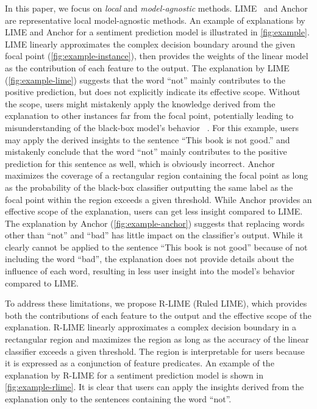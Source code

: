\documentclass[runningheads]{llncs}
\begin{document}
In this paper,
we focus on \emph{local} and \emph{model-agnostic} methods.
LIME~\cite{ribeiro2016why} and Anchor~\cite{ribeiro2018anchors}
are representative local model-agnostic methods.
An example of explanations by LIME and Anchor
for a sentiment prediction model is illustrated in \cref{fig:example}.
LIME linearly approximates the complex decision boundary
around the given focal point (\cref{fig:example-instance}),
then provides the weights of the linear model as the contribution of each feature
to the output.
The explanation by LIME (\cref{fig:example-lime}) suggests that
the word ``not'' mainly contributes to the positive prediction,
but does not explicitly indicate its effective scope.
Without the scope,
users might mistakenly apply the knowledge derived from the explanation
to other instances far from the focal point,
potentially leading to misunderstanding of the black-box model's behavior
~\cite{ribeiro2018anchors}.
For this example,
users may apply the derived insights
to the sentence ``This book is not good.'' %
and mistakenly conclude that the word ``not''
mainly contributes to the positive prediction for this sentence as well,
which is obviously incorrect.
Anchor maximizes the coverage of a rectangular region containing the focal point
as long as the probability of the black-box classifier outputting
the same label as the focal point within the region exceeds a given threshold.
While Anchor provides an effective scope of the explanation,
users can get less insight compared to LIME\@.
The explanation by Anchor (\cref{fig:example-anchor})
suggests that replacing words other than ``not'' and ``bad''
has little impact on the classifier's output.
While it clearly cannot be applied to the sentence ``This book is not good''
because of not including the word ``bad'',
the explanation does not provide details about the influence of each word,
resulting in less user insight into the model's behavior compared to LIME\@.

To address these limitations,
we propose R-LIME (Ruled LIME),
which provides both the contributions of each feature to the output
and the effective scope of the explanation.
R-LIME linearly approximates a complex decision boundary
in a rectangular region and maximizes the region
as long as the accuracy of the linear classifier exceeds a given threshold.
The region is interpretable for users because it is
expressed as a conjunction of feature predicates.
An example of the explanation by R-LIME for a sentiment prediction model
is shown in \cref{fig:example-rlime}.
It is clear that users can apply the insights derived from the explanation
only to the sentences containing the word ``not''.
\end{document}

